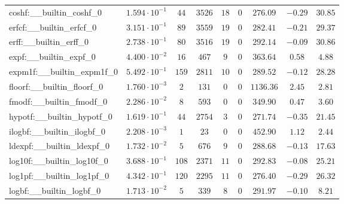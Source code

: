 \begin{tabular}{|l|c|c|c|c|c|c|c|c|}
coshf:\_\_builtin\_coshf\_0               & $ 1.594 \cdot 10^{-1} $ & $ 44     $ & $ 3526  $ & $ 18  $ & $ 0   $ & $ 276.09      $ & $ -0.29   $ & $ 30.85   $ \\
erfcf:\_\_builtin\_erfcf\_0               & $ 3.151 \cdot 10^{-1} $ & $ 89     $ & $ 3559  $ & $ 19  $ & $ 0   $ & $ 282.41      $ & $ -0.21   $ & $ 29.37   $ \\
erff:\_\_builtin\_erff\_0                 & $ 2.738 \cdot 10^{-1} $ & $ 80     $ & $ 3516  $ & $ 19  $ & $ 0   $ & $ 292.14      $ & $ -0.09   $ & $ 30.86   $ \\
expf:\_\_builtin\_expf\_0                 & $ 4.400 \cdot 10^{-2} $ & $ 16     $ & $ 467   $ & $ 9   $ & $ 0   $ & $ 363.64      $ & $ 0.58    $ & $ 4.88    $ \\
expm1f:\_\_builtin\_expm1f\_0             & $ 5.492 \cdot 10^{-1} $ & $ 159    $ & $ 2811  $ & $ 10  $ & $ 0   $ & $ 289.52      $ & $ -0.12   $ & $ 28.28   $ \\
floorf:\_\_builtin\_floorf\_0             & $ 1.760 \cdot 10^{-3} $ & $ 2      $ & $ 131   $ & $ 0   $ & $ 0   $ & $ 1136.36     $ & $ 2.45    $ & $ 2.81    $ \\
fmodf:\_\_builtin\_fmodf\_0               & $ 2.286 \cdot 10^{-2} $ & $ 8      $ & $ 593   $ & $ 0   $ & $ 0   $ & $ 349.90      $ & $ 0.47    $ & $ 3.60    $ \\
hypotf:\_\_builtin\_hypotf\_0             & $ 1.619 \cdot 10^{-1} $ & $ 44     $ & $ 2754  $ & $ 3   $ & $ 0   $ & $ 271.74      $ & $ -0.35   $ & $ 21.45   $ \\
ilogbf:\_\_builtin\_ilogbf\_0             & $ 2.208 \cdot 10^{-3} $ & $ 1      $ & $ 23    $ & $ 0   $ & $ 0   $ & $ 452.90      $ & $ 1.12    $ & $ 2.44    $ \\
ldexpf:\_\_builtin\_ldexpf\_0             & $ 1.732 \cdot 10^{-2} $ & $ 5      $ & $ 676   $ & $ 9   $ & $ 0   $ & $ 288.68      $ & $ -0.13   $ & $ 17.63   $ \\
log10f:\_\_builtin\_log10f\_0             & $ 3.688 \cdot 10^{-1} $ & $ 108    $ & $ 2371  $ & $ 11  $ & $ 0   $ & $ 292.83      $ & $ -0.08   $ & $ 25.21   $ \\
log1pf:\_\_builtin\_log1pf\_0             & $ 4.342 \cdot 10^{-1} $ & $ 120    $ & $ 2295  $ & $ 11  $ & $ 0   $ & $ 276.40      $ & $ -0.29   $ & $ 26.32   $ \\
logbf:\_\_builtin\_logbf\_0               & $ 1.713 \cdot 10^{-2} $ & $ 5      $ & $ 339   $ & $ 8   $ & $ 0   $ & $ 291.97      $ & $ -0.10   $ & $ 8.21    $ \\

\end{tabular}
